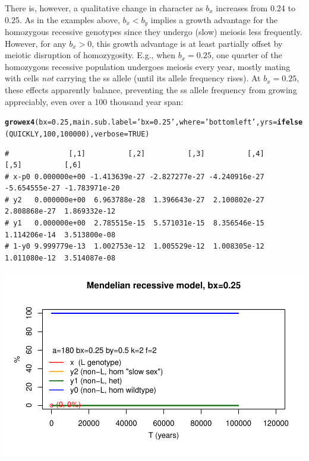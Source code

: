 \documentclass{article}\usepackage[]{graphicx}\usepackage[]{color}
\makeatletter
\def\maxwidth{ %
  \ifdim\Gin@nat@width>\linewidth
    \linewidth
  \else
    \Gin@nat@width
  \fi
}
\newcommand{\hlnum}[1]{\textcolor[rgb]{0.686,0.059,0.569}{#1}}%
\newcommand{\hlstr}[1]{\textcolor[rgb]{0.192,0.494,0.8}{#1}}%
\newcommand{\hlstd}[1]{\textcolor[rgb]{0.345,0.345,0.345}{#1}}%
\newcommand{\hlkwc}[1]{\textcolor[rgb]{0.333,0.667,0.333}{#1}}%
\newcommand{\hlkwd}[1]{\textcolor[rgb]{0.737,0.353,0.396}{\textbf{#1}}}%
\newenvironment{kframe}{%
 \def\at@end@of@kframe{}%
 \ifinner\ifhmode%
  \def\at@end@of@kframe{\end{minipage}}%
  \begin{minipage}{\columnwidth}%
 \fi\fi%
 \def\FrameCommand##1{\hskip\@totalleftmargin \hskip-\fboxsep
 \colorbox{shadecolor}{##1}\hskip-\fboxsep
     \hskip-\linewidth \hskip-\@totalleftmargin \hskip\columnwidth}%
 \MakeFramed {\advance\hsize-\width
   \@totalleftmargin\z@ \linewidth\hsize
   \@setminipage}}%
 {\par\unskip\endMakeFramed%
 \at@end@of@kframe}
\newenvironment{knitrout}{}{} %
\makeatother
\begin{document}
There is, however, a qualitative change in character as $b_x$ increases from 0.24 to 0.25.  As in
the examples above, $b_x<b_y$ implies a growth advantage for the homozygous recessive genotypes
since they undergo (slow) meiosis less frequently.  However, for any $b_x>0$, this growth advantage
is at least partially offset by meiotic disruption of homozygosity.  E.g., when $b_x=0.25$, one
quarter of the homozygous recessive population undergoes meiosis every year, mostly mating with
cells \textit{not} carrying the ss allele (until its allele frequency rises).  At $b_x=0.25$, these
effects apparently balance, preventing the ss allele frequency from growing appreciably, even over a
100 thousand year span:

\begin{knitrout}\footnotesize
{}\color{fgcolor}\begin{kframe}
\begin{alltt}
\hlkwd{growex4}\hlstd{(}\hlkwc{bx}\hlstd{=}\hlnum{0.25}\hlstd{,} \hlkwc{main.sub.label}\hlstd{=}\hlstr{'bx=0.25'}\hlstd{,} \hlkwc{where}\hlstd{=}\hlstr{'bottomleft'}\hlstd{,}\hlkwc{yrs}\hlstd{=}\hlkwd{ifelse}\hlstd{(QUICKLY,}\hlnum{100}\hlstd{,}\hlnum{100000}\hlstd{),}\hlkwc{verbose} \hlstd{=} \hlnum{TRUE}\hlstd{)}
\end{alltt}
\begin{verbatim}
#              [,1]          [,2]          [,3]          [,4]          [,5]          [,6]
# x-p0 0.000000e+00 -1.413639e-27 -2.827277e-27 -4.240916e-27 -5.654555e-27 -1.783971e-20
# y2   0.000000e+00  6.963788e-28  1.396643e-27  2.100802e-27  2.808868e-27  1.869332e-12
# y1   0.000000e+00  2.785515e-15  5.571031e-15  8.356546e-15  1.114206e-14  3.513800e-08
# 1-y0 9.999779e-13  1.002753e-12  1.005529e-12  1.008305e-12  1.011080e-12  3.514087e-08
\end{verbatim}
\end{kframe}

{\centering \includegraphics[width=\maxwidth]{asex-figs-knitr/unnamed-chunk-24-1} 

}



\end{knitrout}
\end{document}
